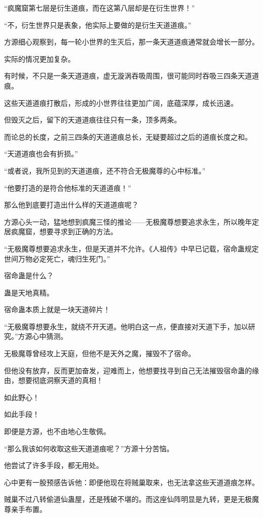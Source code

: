 \begin{this_body}
“疯魔窟第七层是衍生道痕，而在这第八层却是在衍生世界！”

“不，衍生世界只是表象，他实际上要做的是衍生天道道痕。”

方源细心观察到，每一轮小世界的生灭后，那一条天道道痕通常就会增长一部分。

实际的情况更加复杂。

有时候，不只是一条天道道痕，虚无漩涡吞吸周围，很可能同时吞吸三四条天道道痕。

这些天道道痕打散后，形成的小世界往往更加广阔，底蕴深厚，成长迅速。

但毁灭之后，留下的天道道痕往往只有一条，顶多两条。

而论总的长度，之前三四条的天道道痕总长，无疑要超过之后的道痕长度之和。

“天道道痕也会有折损。”

“或者说，我所见到的天道道痕，还不符合无极魔尊的心中标准。”

“他要打造的是符合他标准的天道道痕！”

那么他到底要打造出什么样的天道道痕呢？

方源心头一动，猛地想到疯魔三怪的推论——无极魔尊想要追求永生，所以晚年定居疯魔窟，想要寻求到正确的方法。

“无极魔尊想要追求永生，但是天道并不允许。《人祖传》中早已记载，宿命蛊规定世间万物必定死亡，魂归生死门。”

宿命蛊是什么？

蛊是天地真精。

宿命蛊本质上就是一块天道碎片！

“无极魔尊想要永生，就绕不开天道。他明白这一点，便直接对天道下手，加以研究。”方源心中猜测。

无极魔尊曾经攻上天庭，但他不是天外之魔，摧毁不了宿命。

但他没有放弃，反而更加奋发，迎难而上，他想要找寻到自己无法摧毁宿命蛊的缘由，想要彻底洞察天道的真相！

如此野心！

如此手段！

即便是方源，也不由地心生敬佩。

“那么我该如何收取这些天道道痕呢？”方源十分苦恼。

他尝试了许多手段，都无用处。

心中更有一股预感告诉他：即便他现在将贼巢取来，也无法拿这些天道道痕怎样。

贼巢不过八转偷道仙蛊屋，还是残破不堪的。而这座仙阵明显是九转，更是无极魔尊亲手布置。


\end{this_body}
